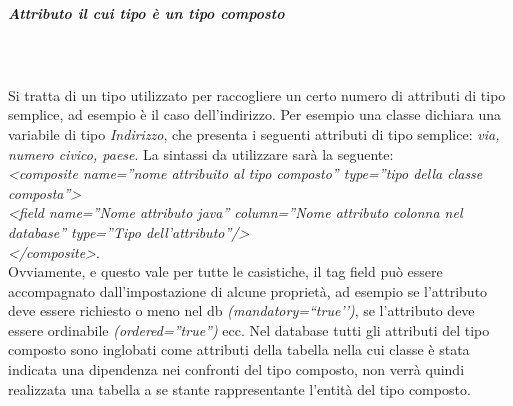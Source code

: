 \subparagraph{Attributo il cui tipo \`{e} un tipo composto} \quad \quad \\ \\
Si tratta di un tipo utilizzato per raccogliere un certo numero di attributi di tipo semplice, ad esempio \`{e} il caso dell\textquoteright{}indirizzo. Per esempio una classe dichiara una variabile di tipo \textit{Indirizzo}, che presenta i seguenti attributi di tipo semplice: \textit{via, numero civico, paese}.
La sintassi da utilizzare sar\`{a} la seguente:\\
\textit{<composite name=''nome attribuito al tipo composto'' type=''tipo della classe composta''>} \\
\textit{<field name=''Nome attributo java'' column=''Nome attributo colonna nel database'' type=''Tipo dell\textquoteright{}attributo''/>} \\
\textit{</composite>}.\\
Ovviamente, e questo vale per tutte le casistiche, il tag field pu\`{o} essere accompagnato dall\textquoteright{}impostazione di alcune propriet\`{a}, ad esempio se l\textquoteright{}attributo deve essere richiesto o meno nel db \textit{(mandatory=``true\textquoteright{}\textquoteright{})}, se l\textquoteright{}attributo deve essere ordinabile \textit{(ordered=''true'')} ecc. Nel database tutti gli attributi del tipo composto sono inglobati come attributi della tabella nella cui classe \`{e} stata indicata una dipendenza nei confronti del tipo composto, non verr\`{a} quindi realizzata una tabella a se stante rappresentante l\textquoteright{}entit\`{a} del tipo composto.

